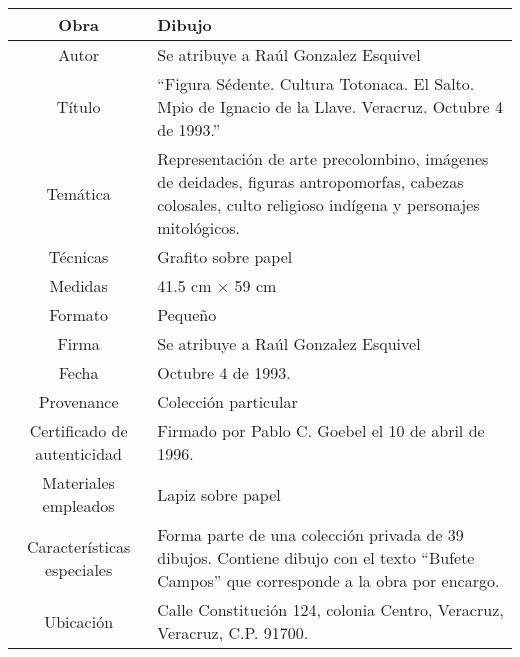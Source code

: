 \begin{table}[H]
\centering
\begin{tabular}{|c|m{}|}
\hline
Obra& Dibujo	\\
\hline
Autor & Se atribuye a Ra\'ul Gonzalez Esquivel\\
\hline
T\'itulo & ``Figura S\'edente. Cultura Totonaca. El Salto. Mpio de Ignacio de la Llave. Veracruz. Octubre 4 de 1993.'' \\
\hline
Tem\'atica & Representaci\'on de arte precolombino, im\'agenes de deidades, figuras antropomorfas, cabezas colosales, culto religioso ind\'igena y personajes mitol\'ogicos.\\
\hline
T\'ecnicas &Grafito sobre papel \\
\hline
Medidas & 41.5 cm $\times$ 59 cm \\
\hline
 Formato & Peque\~no \\
 \hline
 Firma & Se atribuye a Ra\'ul Gonzalez Esquivel\\ 
 \hline
  Fecha & Octubre 4 de 1993. \\
 \hline
 Provenance & Colecci\'on particular\\
 \hline
 Certificado de autenticidad& Firmado por Pablo C. Goebel el 10 de abril de 1996.  \\
 \hline 
  Materiales empleados & Lapiz sobre papel\\
 \hline
 Caracter\'isticas especiales & Forma parte de una colecci\'on privada de 39 dibujos. 
Contiene dibujo con el texto ``Bufete Campos'' que corresponde a la obra por encargo. \\
\hline 
Ubicaci\'on & Calle Constituci\'on 124, colonia Centro, Veracruz, Veracruz, C.P. 91700.\\
\hline

\end{tabular}
\end{table}

